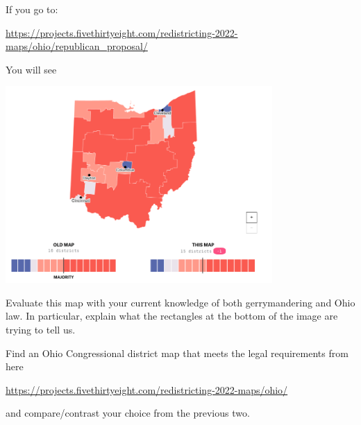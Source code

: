 \documentclass[noauthor,nooutcomes,hints,handout]{ximera}
\begin{document}
\begin{question}
  If you go to:
  \begin{center}
  \url{https://projects.fivethirtyeight.com/redistricting-2022-maps/ohio/republican_proposal/}
  \end{center}
  You will see
  \begin{center}
    \includegraphics[width=4in]{repProp.png}
  \end{center}
  Evaluate this map with your current knowledge of both gerrymandering
  and Ohio law.  In particular, explain what the rectangles at the
  bottom of the image are trying to tell us.
\end{question}



\mynewpage

\begin{question}
  Find an Ohio Congressional district map that meets the legal
  requirements from here
  \begin{center}
    \url{https://projects.fivethirtyeight.com/redistricting-2022-maps/ohio/}
  \end{center}
  and compare/contrast your choice from the previous two.
\end{question}
\end{document}
